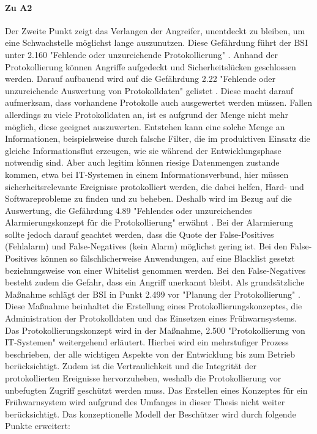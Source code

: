 \documentclass[11pt,a4paper]{report}
\begin{document}
\paragraph{Zu A2} Der Zweite Punkt zeigt das Verlangen der Angreifer, unentdeckt zu bleiben, um eine Schwachstelle möglichst lange auszunutzen. Diese Gefährdung führt der BSI unter 2.160 "Fehlende oder unzureichende Protokollierung" \cite{bsi_g2160}. Anhand der Protokollierung können Angriffe aufgedeckt und Sicherheitslücken geschlossen werden. Darauf aufbauend wird auf die Gefährdung 2.22 "Fehlende oder unzureichende Auswertung von Protokolldaten" gelistet \cite{bsi_g2022}. Diese macht darauf aufmerksam, dass vorhandene Protokolle auch ausgewertet werden müssen. Fallen allerdings zu viele Protokolldaten an, ist es aufgrund der Menge nicht mehr möglich, diese geeignet auszuwerten. Entstehen kann eine solche Menge an Informationen, beispielsweise durch falsche Filter, die im produktiven Einsatz die gleiche Informationsflut erzeugen, wie sie während der Entwicklungsphase notwendig sind. Aber auch legitim können riesige Datenmengen zustande kommen, etwa bei IT-Systemen in einem Informationsverbund, hier müssen sicherheitsrelevante Ereignisse protokolliert werden, die dabei helfen, Hard- und Softwareprobleme zu finden und zu beheben. Deshalb wird im Bezug auf die Auswertung, die Gefährdung 4.89 "Fehlendes oder unzureichendes Alarmierungskonzept für die Protokollierung" erwähnt \cite{bsi_g4089}. Bei der Alarmierung sollte jedoch darauf geachtet werden, dass die Quote der False-Positives (Fehlalarm) und False-Negatives (kein Alarm) möglichst gering ist. Bei den False-Positives können so fälschlicherweise Anwendungen, auf eine Blacklist gesetzt beziehungsweise von einer Whitelist genommen werden. Bei den False-Negatives besteht zudem die Gefahr, dass ein Angriff unerkannt bleibt. Als grundsätzliche Maßnahme schlägt der BSI in Punkt 2.499 vor "Planung der Protokollierung" \cite{bsi_m2499}. Diese Maßnahme beinhaltet die Erstellung eines Protokollierungskonzeptes, die Administration der Protokolldaten und das Einsetzen eines Frühwarnsystems. Das Protokollierungskonzept wird in der Maßnahme, 2.500 "Protokollierung von IT-Systemen" weitergehend erläutert. Hierbei wird ein mehrstufiger Prozess beschrieben, der alle wichtigen Aspekte von der Entwicklung bis zum Betrieb berücksichtigt. Zudem ist die Vertraulichkeit und die Integrität der protokollierten Ereignisse hervorzuheben, weshalb die Protokollierung vor unbefugten Zugriff geschützt werden muss. Das Erstellen eines Konzeptes für ein Frühwarnsystem wird aufgrund des Umfanges in dieser Thesis nicht weiter berücksichtigt.  Das konzeptionelle Modell der Beschützer wird durch folgende Punkte erweitert:
\end{document}
